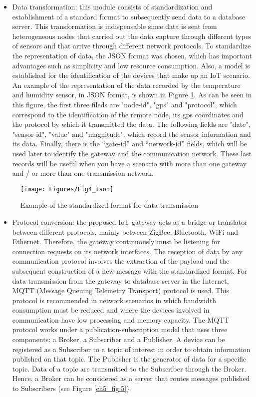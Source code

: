 \begin{itemize}
\item Data transformation: this module consists of standardization and establishment of a standard format to subsequently send data to a database server. This transformation is indispensable since data is sent from heterogeneous nodes that carried out the data capture through different types of sensors and that arrive through different network protocols. To standardize the representation of data, the JSON format was chosen, which has important advantages such as simplicity and low resource consumption. Also, a model is established for the identification of the devices that make up an IoT scenario. An example of the representation of the data recorded by the temperature and humidity sensor, in JSON format, is shown in Figure \ref{ch5_fig:4}. As can be seen in this figure, the first three fileds are "node-id", "gps" and "protocol", which correspond to the identification of the remote node, its gps coordinates and the protocol by which it transmitted the data. The following fields are "date", "sensor-id", "value" and "magnitude", which record the sensor information and its data. Finally, there is the “gate-id” and “network-id” fields, which will be used later to identify the gateway and the communication network. These last records will be useful when you have a scenario with more than one gateway and / or more than one transmission network.
\end{itemize}

\begin{figure}[ht!]
\centering
\texttt{[image: Figures/Fig4\_Json]}
\caption{Example of the standardized format for data transmission}
\label{ch5_fig:4}       %
\end{figure}

\begin{itemize}
\item Protocol conversion: the proposed IoT gateway acts as a bridge or translator between different protocols, mainly between ZigBee, Bluetooth, WiFi and Ethernet. Therefore, the gateway continuously must be listening for connection requests on its network interfaces. The reception of data by any communication protocol involves the extraction of the payload and the subsequent construction of a new message with the standardized format. For data transmission from the gateway to database server in the Internet, MQTT (Message Queuing Telemetry Transport) \cite{ISO2016} protocol is used. This protocol is recommended in network scenarios in which bandwidth consumption must be reduced and where the devices involved in communication have low processing and memory capacity. The MQTT protocol works under a publication-subscription model that uses three components: a Broker, a Subscriber and a Publisher. A device can be registered as a Subscriber to a topic of interest in order to obtain information published on that topic. The Publisher is the generator of data for a specific topic. Data of a topic are transmitted to the Subscriber through the Broker. Hence, a Broker can be considered as a server that routes messages published to Subscribers (see Figure \ref{ch5_fig:5}).
\end{itemize}

